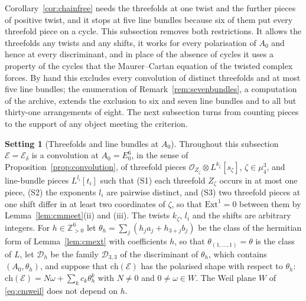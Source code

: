 \documentclass[11pt,reqno]{amsart}
\makeatletter
\renewcommand\subsection{\@startsection{subsection}{2}\z@{.6\linespacing\@plus.7\linespacing}{.3\linespacing}{\normalfont\bfseries}}
\numberwithin{equation}{section}
\theoremstyle{plain}
\theoremstyle{definition}
\newtheorem{setup}[theorem]{Setting}
\newcommand{\ZZ}{\mathbb{Z}}
\newcommand{\Ext}{\mathrm{Ext}}
\newcommand{\ch}{\mathrm{ch}}
\newcommand{\cD}{\mathcal{D}}
\makeatother
\begin{document}
\subsection{Chains through line bundles}\label{ssec:linebundles}

Corollary~\ref{cor:chainfree} needs the threefolds at one twist and the further pieces of positive twist, and it stops at five line bundles because six of them put every threefold piece on a cycle. This subsection removes both restrictions. It allows the threefolds any twists and any shifts, it works for every polarisation of $A_{0}$ and hence at every discriminant, and in place of the absence of cycles it uses a property of the cycles that the Maurer--Cartan equation of the twisted complex forces. By hand this excludes every convolution of distinct threefolds and at most five line bundles; the enumeration of Remark~\ref{rem:sevenbundles}, a computation of the archive, extends the exclusion to six and seven line bundles and to all but thirty-one arrangements of eight. The next subsection turns from counting pieces to the support of any object meeting the criterion.

\begin{setup}[Threefolds and line bundles at $A_{0}$]\label{setup:lb}
Throughout this subsection $\mathcal{E}=\mathcal{E}_{\delta}$ is a convolution at $A_{0}=E_{0}^{6}$, in the sense of Proposition~\ref{prop:convolution}, of threefold pieces $\mathcal{O}_{Z_{\zeta}}\otimes L^{k_{\zeta}}[s_{\zeta}]$, $\zeta\in\mu_{4}^{3}$, and line-bundle pieces $L^{l_{i}}[t_{i}]$ such that (S1) each threefold $Z_{\zeta}$ occurs in at most one piece, (S2) the exponents $l_{i}$ are pairwise distinct, and (S3) two threefold pieces at one shift differ in at least two coordinates of $\zeta$, so that $\Ext^{1}=0$ between them by Lemma~\ref{lem:cmmeet}(ii) and (iii). The twists $k_{\zeta}$, $l_{i}$ and the shifts are arbitrary integers. For $h\in\ZZ_{>0}^{6}$ let $\theta_{h}=\sum_{j}(h_{j}a_{j}+h_{3+j}b_{j})$ be the class of the hermitian form of Lemma~\ref{lem:cmext} with coefficients $h$, so that $\theta_{(1,\dots,1)}=\theta$ is the class of $L$, let $\cD_{h}$ be the family $\cD_{3,3}$ of the discriminant of $\theta_{h}$, which contains $(A_{0},\theta_{h})$, and suppose that $\ch(\mathcal{E})$ has the polarised shape with respect to $\theta_{h}$: $\ch(\mathcal{E})=N\omega+\sum_{k}c_{k}\theta_{h}^{k}$ with $N\ne0$ and $0\ne\omega\in W$. The Weil plane $W$ of \eqref{eq:cmweil} does not depend on $h$.
\end{setup}
\end{document}
